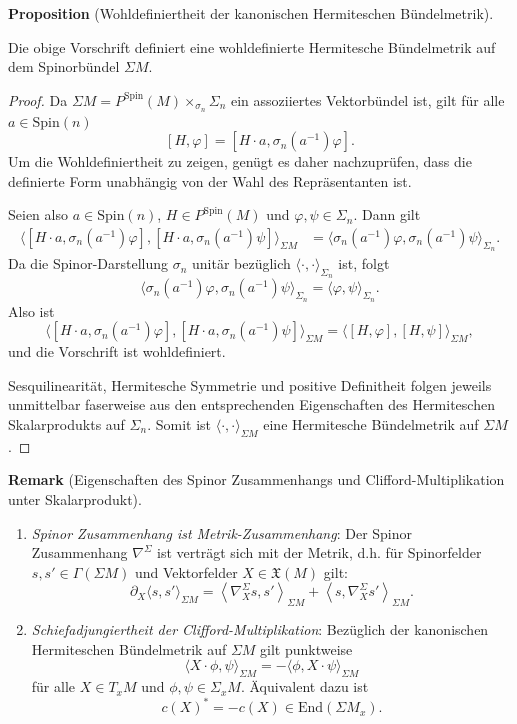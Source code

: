 \documentclass[10pt, letterpaper]{article}
\newcommand{\End}{\mathrm{End}}
\newcommand{\Spin}{\mathrm{Spin}}
\newcommand{\CustomHeading}[3]{%
  \par\medskip\noindent%
  \textbf{#1 #2} \textnormal{(#3)}.\enskip%
}
\newenvironment{PROP}[2]{\CustomHeading{Proposition}{#1}{#2}}{}
\newenvironment{REM}[2]{\CustomHeading{Remark}{#1}{#2}}{}
\begin{document}
\begin{PROP}{}{Wohldefiniertheit der kanonischen Hermiteschen Bündelmetrik}
Die obige Vorschrift definiert eine wohldefinierte Hermitesche Bündelmetrik auf
dem Spinorbündel \(\Sigma M\).
\end{PROP}

\begin{proof}
Da \(\Sigma M=P^{\Spin}(M)\times_{\sigma_n}\Sigma_n\) ein assoziiertes
Vektorbündel ist, gilt für alle \(a\in \Spin(n)\)
\[
[H,\varphi]=[H\cdot a,\sigma_n(a^{-1})\varphi].
\]
Um die Wohldefiniertheit zu zeigen, genügt es daher nachzuprüfen, dass die
definierte Form unabhängig von der Wahl des Repräsentanten ist.

Seien also \(a\in \Spin(n)\), \(H\in P^{\Spin}(M)\) und \(\varphi,\psi\in \Sigma_n\).
Dann gilt
\[
\begin{aligned}
\bigl\langle [H\cdot a,\sigma_n(a^{-1})\varphi],
[H\cdot a,\sigma_n(a^{-1})\psi]\bigr\rangle_{\Sigma M}
&=
\bigl\langle \sigma_n(a^{-1})\varphi,\sigma_n(a^{-1})\psi\bigr\rangle_{\Sigma_n}.
\end{aligned}
\]
Da die Spinor-Darstellung \(\sigma_n\) unitär bezüglich
\(\langle\cdot,\cdot\rangle_{\Sigma_n}\) ist, folgt
\[
\bigl\langle \sigma_n(a^{-1})\varphi,\sigma_n(a^{-1})\psi\bigr\rangle_{\Sigma_n}
=
\langle \varphi,\psi\rangle_{\Sigma_n}.
\]
Also ist
\[
\bigl\langle [H\cdot a,\sigma_n(a^{-1})\varphi],
[H\cdot a,\sigma_n(a^{-1})\psi]\bigr\rangle_{\Sigma M}
=
\bigl\langle [H,\varphi],[H,\psi]\bigr\rangle_{\Sigma M},
\]
und die Vorschrift ist wohldefiniert.

Sesquilinearität, Hermitesche Symmetrie und positive Definitheit folgen jeweils
unmittelbar faserweise aus den entsprechenden Eigenschaften des Hermiteschen
Skalarprodukts auf \(\Sigma_n\). Somit ist \(\langle\cdot,\cdot\rangle_{\Sigma M}\)
eine Hermitesche Bündelmetrik auf \(\Sigma M\).
\end{proof}




\begin{REM}{}{Eigenschaften des Spinor Zusammenhangs und Clifford-Multiplikation unter Skalarprodukt}
    \begin{enumerate}
        \item \emph{Spinor Zusammenhang ist Metrik-Zusammenhang}: Der Spinor Zusammenhang $\nabla^\Sigma$ ist verträgt sich mit der Metrik, d.h. für Spinorfelder $s,s'\in\Gamma(\Sigma M)$ und Vektorfelder $X\in\mathfrak{X}(M)$ gilt:
        $$
        \partial_X\langle s, s'\rangle_{\Sigma M}=\left\langle\nabla_X^{\Sigma} s, s'\right\rangle_{\Sigma M}+\left\langle s, \nabla_X^{\Sigma} s'\right\rangle _{\Sigma M}.
        $$
        \item \emph{Schiefadjungiertheit der Clifford-Multiplikation}: Bezüglich der kanonischen Hermiteschen Bündelmetrik auf \(\Sigma M\) gilt
        punktweise
        \[ \langle X\cdot \phi,\psi\rangle_{\Sigma M} = -\langle \phi, X\cdot \psi\rangle_{\Sigma M}\]
        für alle \(X\in T_xM\) und \(\phi,\psi\in \Sigma_xM\). Äquivalent dazu ist
        \[
        c(X)^*=-c(X)\in \End(\Sigma M_x).
        \]
    \end{enumerate}
\end{REM}
\end{document}
